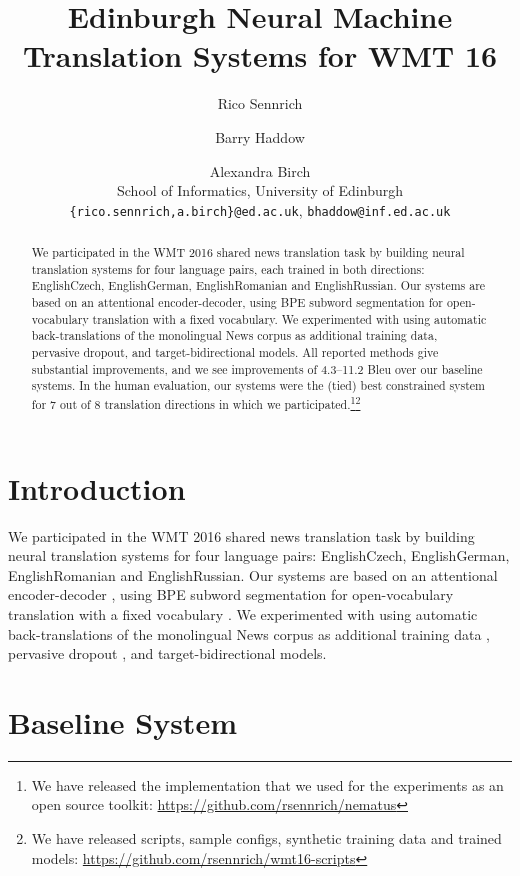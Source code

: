 \documentclass[11pt]{article}
\title{Edinburgh Neural Machine Translation Systems for WMT 16}
\author{
Rico Sennrich\and Barry Haddow \and Alexandra Birch\\
School of Informatics, University of Edinburgh\\
{\tt \{rico.sennrich,a.birch\}@ed.ac.uk}, {\tt bhaddow@inf.ed.ac.uk}
}
\date{}
\begin{document}
\maketitle
\begin{abstract}

We participated in the WMT 2016 shared news translation task by building neural translation systems for four language pairs, each trained in both directions:
EnglishCzech, EnglishGerman, EnglishRomanian and EnglishRussian.
Our systems are based on an attentional encoder-decoder,
using BPE subword segmentation for open-vocabulary translation with a fixed vocabulary.
We experimented with using automatic back-translations of the monolingual News corpus as additional training data,
pervasive dropout, and target-bidirectional models.
All reported methods give substantial improvements, and we see improvements of 4.3--11.2 {\sc Bleu} over our baseline systems.
In the human evaluation, our systems were the (tied) best constrained system for 7 out of 8 translation directions in which we participated.\footnote{We have released the implementation that we used for the experiments as an open source toolkit: \url{https://github.com/rsennrich/nematus}}\footnote{We have released scripts, sample configs, synthetic training data and trained models: \url{https://github.com/rsennrich/wmt16-scripts}}

\end{abstract}

\section{Introduction}

We participated in the WMT 2016 shared news translation task by building neural translation systems for four language pairs:
EnglishCzech, EnglishGerman, EnglishRomanian and EnglishRussian.
Our systems are based on an attentional encoder-decoder \cite{DBLP:journals/corr/BahdanauCB14},
using BPE subword segmentation for open-vocabulary translation with a fixed vocabulary \cite{DBLP:journals/corr/SennrichHB15}.
We experimented with using automatic back-translations of the monolingual News corpus as additional training data \cite{2015arXiv151106709S},
pervasive dropout \cite{2015arXiv151205287G}, and target-bidirectional models.


\section{Baseline System}
\end{document}
